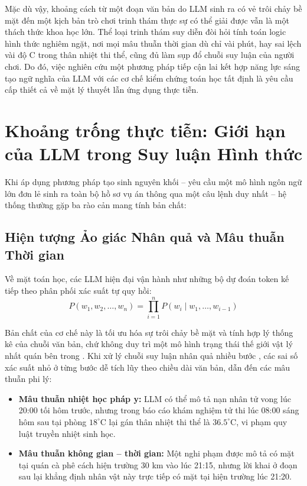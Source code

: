 Mặc dù vậy, khoảng cách từ một đoạn văn bản do LLM sinh ra có vẻ trôi chảy bề mặt đến một kịch bản trò chơi trinh thám thực sự có thể giải được vẫn là một thách thức khoa học lớn. Thể loại trinh thám suy diễn đòi hỏi tính toán logic hình thức nghiêm ngặt, nơi mọi mâu thuẫn thời gian dù chỉ vài phút, hay sai lệch vài độ C trong thân nhiệt thi thể, cũng đủ làm sụp đổ chuỗi suy luận của người chơi. Do đó, việc nghiên cứu một phương pháp tiếp cận lai kết hợp năng lực sáng tạo ngữ nghĩa của LLM với các cơ chế kiểm chứng toán học tất định là yêu cầu cấp thiết cả về mặt lý thuyết lẫn ứng dụng thực tiễn.

\section{Khoảng trống thực tiễn: Giới hạn của LLM trong Suy luận Hình thức}
\label{sec:intro_limitations}

Khi áp dụng phương pháp tạo sinh nguyên khối -- yêu cầu một mô hình ngôn ngữ lớn đơn lẻ sinh ra toàn bộ hồ sơ vụ án thông qua một câu lệnh duy nhất -- hệ thống thường gặp ba rào cản mang tính bản chất:

\subsection{Hiện tượng Ảo giác Nhân quả và Mâu thuẫn Thời gian}
Về mặt toán học, các LLM hiện đại vận hành như những bộ dự đoán token kế tiếp theo phân phối xác suất tự quy hồi:
\begin{equation}
    P(w_1, w_2, \dots, w_n) = \prod_{i=1}^n P(w_i \mid w_1, \dots, w_{i-1})
\end{equation}

Bản chất của cơ chế này là tối ưu hóa sự trôi chảy bề mặt và tính hợp lý thống kê của chuỗi văn bản, chứ không duy trì một mô hình trạng thái thế giới vật lý nhất quán bên trong \cite{marcus2020next}. Khi xử lý chuỗi suy luận nhân quả nhiều bước \cite{pearl2009causality}, các sai số xác suất nhỏ ở từng bước dễ tích lũy theo chiều dài văn bản, dẫn đến các mâu thuẫn phi lý:
\begin{itemize}[leftmargin=1.5cm]
    \item \textbf{Mâu thuẫn nhiệt học pháp y:} LLM có thể mô tả nạn nhân tử vong lúc 20:00 tối hôm trước, nhưng trong báo cáo khám nghiệm tử thi lúc 08:00 sáng hôm sau tại phòng $18^\circ\text{C}$ lại gán thân nhiệt thi thể là $36.5^\circ\text{C}$, vi phạm quy luật truyền nhiệt sinh học.
    \item \textbf{Mâu thuẫn không gian -- thời gian:} Một nghi phạm được mô tả có mặt tại quán cà phê cách hiện trường 30 km vào lúc 21:15, nhưng lời khai ở đoạn sau lại khẳng định nhân vật này trực tiếp có mặt tại hiện trường lúc 21:20.
\end{itemize}


